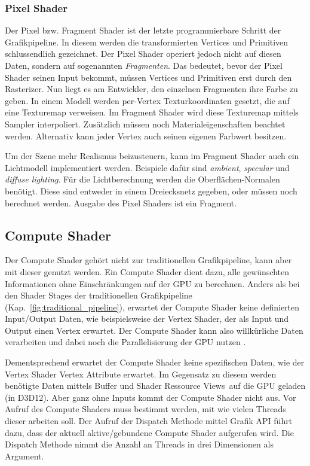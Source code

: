 \subsubsection{Pixel Shader}
\label{subsubsec:pixel_shader}
Der Pixel bzw. Fragment Shader ist der letzte programmierbare Schritt der Grafikpipeline.
In diesem werden die transformierten Vertices und Primitiven schlussendlich gezeichnet.
Der Pixel Shader operiert jedoch nicht auf diesen Daten, sondern auf sogenannten \textit{Fragmenten}.
Das bedeutet, bevor der Pixel Shader seinen Input bekommt, müssen Vertices und Primitiven erst durch den Rasterizer.
Nun liegt es am Entwickler, den einzelnen Fragmenten ihre Farbe zu geben.
In einem Modell werden per-Vertex Texturkoordinaten gesetzt, die auf eine Texturemap verweisen.
Im Fragment Shader wird diese Texturemap mittels Sampler interpoliert.
Zusätzlich müssen noch Materialeigenschaften beachtet werden.
Alternativ kann jeder Vertex auch seinen eigenen Farbwert besitzen. \newline

Um der Szene mehr Realismus beizusteuern, kann im Fragment Shader auch ein Lichtmodell implementiert werden.
Beispiele dafür sind \textit{ambient}, \textit{specular} und \textit{diffuse lighting}.
Für die Lichtberechnung werden die Oberflächen-Normalen benötigt.
Diese sind entweder in einem Dreiecksnetz gegeben, oder müssen noch berechnet werden.
Ausgabe des Pixel Shaders ist ein Fragment.

\subsection{Compute Shader}
\label{subsec:compute_shader}
Der Compute Shader gehört nicht zur traditionellen Grafikpipeline, kann aber mit dieser genutzt werden.
Ein Compute Shader dient dazu, alle gewünschten Informationen ohne Einschränkungen auf der GPU zu berechnen.
Anders als bei den Shader Stages der traditionellen Grafikpipeline (Kap.~\ref{fig:traditional_pipeline}), erwartet der Compute Shader keine definierten Input/Output Daten, wie beispielsweise der Vertex Shader, der als Input und Output einen Vertex erwartet.
Der Compute Shader kann also willkürliche Daten verarbeiten und dabei noch die Parallelisierung der GPU nutzen \cite{Compute24}. \newline

Dementsprechend erwartet der Compute Shader keine spezifischen Daten, wie der Vertex Shader Vertex Attribute erwartet.
Im Gegensatz zu diesem werden benötigte Daten mittels Buffer und \glqq Shader Ressource Views\grqq\ auf die GPU geladen (in D3D12).
Aber ganz ohne Inputs kommt der Compute Shader nicht aus.
Vor Aufruf des Compute Shaders muss bestimmt werden, mit wie vielen Threads dieser arbeiten soll.
Der Aufruf der Dispatch Methode mittel Grafik API führt dazu, dass der aktuell aktive/gebundene Compute Shader aufgerufen wird.
Die Dispatch Methode nimmt die Anzahl an Threads in drei Dimensionen als Argument.

